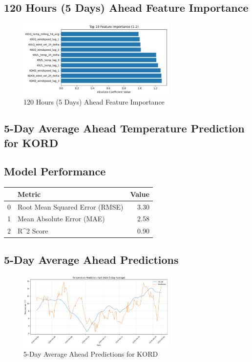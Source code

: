 \subsection{120 Hours (5 Days) Ahead Feature Importance}
\begin{figure}[htbp]
\centering
\includegraphics[width=0.7\textwidth]{1-2-linear_temp_shift_feature_importance.png}
\caption{120 Hours (5 Days) Ahead Feature Importance}
\label{fig:120_hours_(5_days)_ahead_featimp}
\end{figure}



\subsection{5-Day Average Ahead Temperature Prediction for KORD}
\subsection{Model Performance}
\begin{tabular}{llr}
\toprule
 & Metric & Value \\
\midrule
0 & Root Mean Squared Error (RMSE) & 3.30 \\
1 & Mean Absolute Error (MAE) & 2.58 \\
2 & R^2 Score & 0.90 \\
\bottomrule
\end{tabular}

\subsection{5-Day Average Ahead Predictions}
\begin{figure}[htbp]
\centering
\includegraphics[width=0.7\textwidth]{1-3-linear_temp_shift_results.png}
\caption{5-Day Average Ahead Predictions for KORD}
\label{fig:5-day_average_ahead_pred}
\end{figure}

